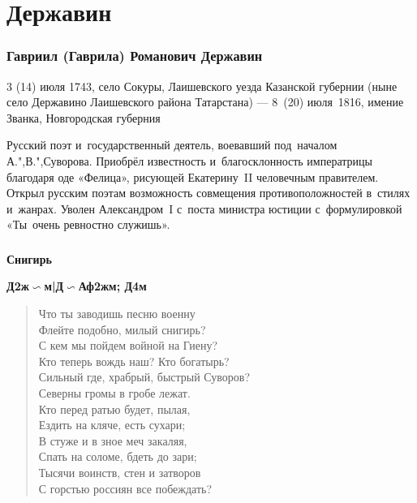 \documentclass{beamer}
\begin{document}
\section{Державин}\label{sec:d}


\begin{frame}
\frametitle{Гавриил (Гаврила) Романович Державин}

\begin{flushleft}
3 (14) июля 1743, село Сокуры, Лаишевского уезда Казанской губернии (ныне село Державино Лаишевского района Татарстана) — 8~(20) июля~1816, имение Званка, Новгородская губерния
\end{flushleft}

\begin{flushleft}
Русский поэт и~государственный деятель, воевавший под~началом А.",В.",Суворова. Приобрёл известность и~благосклонность императрицы благодаря оде «Фелица», рисующей Екатерину~II человечным правителем. Открыл русским поэтам возможность совмещения противоположностей в~стилях и~жанрах. Уволен Александром~I с~поста министра юстиции с~формулировкой «Ты~очень ревностно служишь».
\end{flushleft}

\end{frame}



\begin{frame}
\frametitle{}
\begin{center}
\textbf{Снигирь}
\end{center}

\textbf{Д2ж$ \backsim $м|Д$ \backsim $Аф2жм; Д4м}

\begin{verse}
\hspace{2em}Что ты заводишь песню военну\\
Флейте подобно, милый снигирь?\\
С кем мы пойдем войной на Гиену?\\			
Кто теперь вождь наш? Кто богатырь?\\
Сильный где, храбрый, быстрый Суворов?\\
Северны громы в гробе лежат.\\
		\hspace{2em}Кто перед ратью будет, пылая,\\
Ездить на кляче, есть сухари;\\
В стуже и в зное меч закаляя,\\
Спать на соломе, бдеть до зари;\\
Тысячи воинств, стен и затворов\\
С горстью россиян все побеждать?


\end{verse}


\end{frame}
\end{document}
